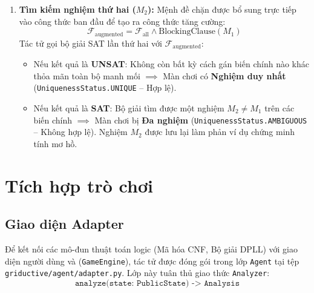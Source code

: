 \begin{enumerate}
    \item \textbf{Tìm kiếm nghiệm thứ hai ($M_2$):}
    Mệnh đề chặn được bổ sung trực tiếp vào công thức ban đầu để tạo ra công thức tăng cường:
    \begin{equation}
        \mathcal{F}_{\text{augmented}} = \mathcal{F}_{\text{all}} \wedge \text{BlockingClause}(M_1)
    \end{equation}
    Tác tử gọi bộ giải SAT lần thứ hai với $\mathcal{F}_{\text{augmented}}$:
    \begin{itemize}
        \item Nếu kết quả là \textbf{UNSAT}: Không còn bất kỳ cách gán biến chính nào khác thỏa mãn toàn bộ manh mối $\implies$ Màn chơi có \textbf{Nghiệm duy nhất} (\texttt{UniquenessStatus.UNIQUE} – Hợp lệ).
        \item Nếu kết quả là \textbf{SAT}: Bộ giải tìm được một nghiệm $M_2 \neq M_1$ trên các biến chính $\implies$ Màn chơi bị \textbf{Đa nghiệm} (\texttt{UniquenessStatus.AMBIGUOUS} – Không hợp lệ). Nghiệm $M_2$ được lưu lại làm phản ví dụ chứng minh tính mơ hồ.
    \end{itemize}
\end{enumerate}

\section{Tích hợp trò chơi}
\label{sec:game_integration}

\subsection{Giao diện Adapter}
Để kết nối các mô-đun thuật toán logic (Mã hóa CNF, Bộ giải DPLL) với giao diện người dùng và (\texttt{GameEngine}), tác tử được đóng gói trong lớp \texttt{Agent} tại tệp \texttt{griductive/agent/adapter.py}. Lớp này tuân thủ giao thức \texttt{Analyzer}:
\begin{equation}
    \texttt{analyze(state: PublicState) -> Analysis}
\end{equation}

